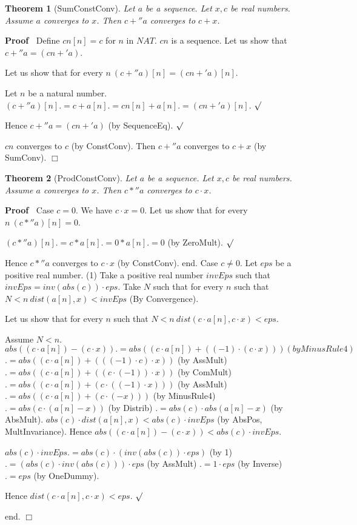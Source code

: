 \documentclass{article}
\newenvironment{forthel}{\begin{leftbar}}{\end{leftbar}}
\newenvironment{proof}{\noindent\textbf{Proof\ }}{\hspace*{\fill}$\Box$\medskip}
\newenvironment{subproof}{\begin{list}{}{}
		\item[\text{Proof}]}{\hfill $\surd$ \end{list}}
\newtheorem{theorem}{Theorem}
\begin{document}
\begin{forthel}
	\begin{theorem} [SumConstConv]
	Let $a$ be a sequence. Let $x,c$ be real numbers. Assume $a$ converges to $x$.
	Then $c +'' a$ converges to $c + x$.
	\end{theorem}
	\begin{proof}
	Define $cn[n] = c$ for $n$ in $NAT$.
	$cn$ is a sequence.
	Let us show that $c +'' a = (cn +' a)$.
	\begin{subproof}
	Let us show that for every $n \ (c +'' a)[n] = (cn +' a)[n]$.
	\begin{subproof}
	Let $n$ be a natural number.
	$(c +'' a)[n] .= c + a[n]
	.= cn[n] + a[n]
	.= (cn +' a)[n]$.
	\end{subproof}
	Hence $c +'' a = (cn +' a)$ (by SequenceEq).
	\end{subproof}
	$cn$ converges to $c$ (by ConstConv).
	Then $c +'' a$ converges to $c + x$ (by SumConv).
	\end{proof}
	
	\begin{theorem} [ProdConstConv]
	Let $a$ be a sequence. Let $x,c$ be real numbers. Assume $a$ converges to $x$.
	Then $c *'' a$ converges to $c \cdot x$.
	\end{theorem}
	\begin{proof}
	Case $c = 0$.
	We have $c \cdot x = 0$.
	Let us show that for every $n \ (c *'' a)[n] = 0$. 
	\begin{subproof}
	$(c *'' a)[n] .= c * a[n]
	.= 0 * a[n]
	.= 0$ (by ZeroMult).
	\end{subproof}
	Hence $c *'' a$ converges to $c \cdot x$ (by ConstConv).
	end.
	Case $c \neq 0$.
	Let $eps$ be a positive real number. 
	(1)     Take a positive real number $invEps$ such that $invEps = inv(abs(c)) \cdot eps$.
	Take $N$ such that for every $n$ such that $N < n \ dist(a[n],x) < invEps$ (By Convergence).
	
	Let us show that for every $n$ such that $N < n \ dist(c \cdot a[n],c \cdot x) < eps$.
	\begin{subproof}
	Assume $N < n$.
	$abs((c \cdot a[n]) - (c \cdot x)) .= abs((c \cdot a[n]) +  ((-1) \cdot (c \cdot x))) (by MinusRule4)$ 
	$.= abs((c \cdot a[n]) + (((-1) \cdot c) \cdot x))$ (by AssMult)
	$.= abs((c \cdot a[n]) + ((c \cdot (-1)) \cdot x))$ (by ComMult)
	$.= abs((c \cdot a[n]) + (c \cdot ((-1) \cdot x)))$ (by AssMult)
	$.= abs((c \cdot a[n]) + (c \cdot (-x)))$ (by MinusRule4)
	$.= abs(c \cdot (a[n] - x))$ (by Distrib)
	$.= abs(c) \cdot abs(a[n] - x)$ (by AbsMult).
	$abs(c) \cdot dist(a[n],x) < abs(c) \cdot invEps$ (by AbsPos, MultInvariance).
	Hence $abs((c \cdot a[n]) - (c \cdot x)) < abs(c) \cdot invEps$.
	
	$abs(c) \cdot invEps .= abs(c) \cdot (inv(abs(c)) \cdot eps)$ (by 1)
	$.= (abs(c) \cdot inv(abs(c))) \cdot eps$ (by AssMult)
	$.= 1 \cdot eps$ (by Inverse)
	$.= eps$ (by OneDummy).
	
	Hence $dist(c \cdot a[n],c \cdot x) < eps$.
	\end{subproof}
	end.
	\end{proof}

\end{forthel}
\end{document}
